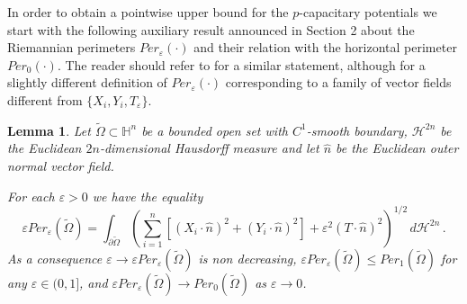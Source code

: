 \documentclass[10pt]{amsart}
\numberwithin{equation}{section}
\newtheorem{lemma}[theorem]{Lemma}
\theoremstyle{definition}
\newcommand{\He}{\mathbb{H}}
\begin{document}
\medskip
In order to obtain a pointwise upper bound for the $p$-capacitary potentials we start with the following auxiliary result announced in Section 2 about the Riemannian perimeters $Per_\varepsilon(\cdot)$ and their relation with the horizontal perimeter $Per_0(\cdot)$. The reader should refer to \cite[Section 5]{MonSeCa} for a similar statement, although for a slightly different definition of  $Per_\varepsilon(\cdot)$ corresponding to a family of vector fields different from $\{ X_i, Y_i, T_\varepsilon\}$.  
\begin{lemma}
\label{perimeter}
Let $\widetilde{\Omega} \subset \He^n$ be a bounded open set with $C^1$-smooth boundary, $\mathcal{H}^{2n}$ be the Euclidean $2n$-dimensional Hausdorff measure and let $\hat{n}$ be the Euclidean outer normal vector field. 

For each $\varepsilon>0$ we have the equality
\begin{equation}
\label{perimeter-rep}
\varepsilon Per_\varepsilon (\widetilde{\Omega})=\int_{\partial \widetilde{\Omega}} \left( \sum_{i=1}^n \left[ \left( X_i \cdot \hat{n} \right)^2 +\left( Y_i \cdot \hat{n} \right)^2 \right] +\varepsilon^2 \left( T \cdot \hat{n} \right)^2 \right)^{1/2} \, d\mathcal{H}^{2n} \, .
\end{equation}
As a consequence $\varepsilon \to \varepsilon Per_\varepsilon (\widetilde{\Omega})$ is non decreasing,  $\varepsilon Per_\varepsilon (\widetilde{\Omega}) \leq  Per_1(\widetilde{\Omega})$ for any $\varepsilon \in (0,1]$, and $\varepsilon Per_\varepsilon (\widetilde{\Omega}) \to Per_0(\widetilde{\Omega})$ as $\varepsilon \to 0$.
\end{lemma}
\end{document}
